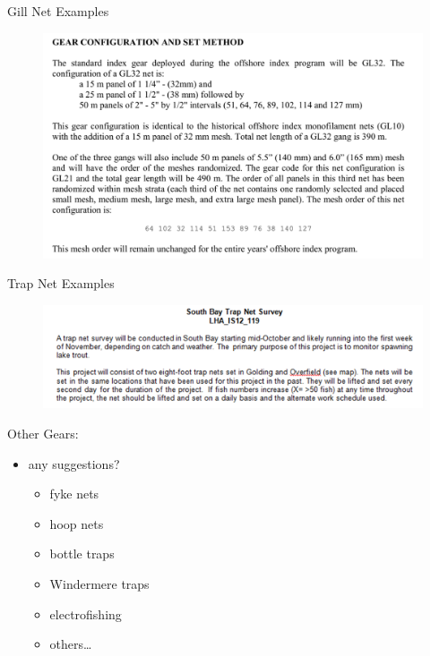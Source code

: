 \documentclass[bigger]{beamer}
\begin{document}
\begin{frame}[label=sec-15]{Gill Net Examples}
\begin{figure}
\includegraphics[width=\textwidth]{GN_Example}
\end{figure}
\end{frame}

\begin{frame}[label=sec-16]{Trap Net Examples}
\begin{figure}
\includegraphics[width=\textwidth]{TP_Example}
\end{figure}
\end{frame}


\begin{frame}[label=sec-17]{Other Gears:}
\begin{itemize}
\item any suggestions?
\begin{itemize}
\item fyke nets
\item hoop nets
\item bottle traps
\item Windermere traps
\item electrofishing
\item others\ldots{}
\end{itemize}
\end{itemize}
\end{frame}
\end{document}
